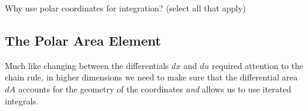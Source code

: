 \documentclass{ximera}
\begin{document}
\begin{problem}
Why use polar coordinates for integration? (select all that apply)
\begin{selectAll}
\end{selectAll}
\end{problem}

\subsection*{The Polar Area Element}

Much like changing between the differentials $dx$ and $du$ required attention to the chain rule, in higher dimensions we need to make sure that the differential area $dA$ accounts for the geometry of the coordinates \emph{and} allows us to use iterated integrals.
\end{document}
